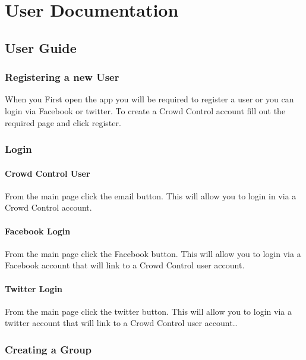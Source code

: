 

\chapter{User Documentation}



\section{User Guide}
 
 \subsection{Registering a new User}
When you First open the app you will be required to register a user or you can login via Facebook or twitter. To create a Crowd Control account fill out the required page and click register.
 
 \subsection{Login}
 
 \subsubsection{Crowd Control User}
 From the main page click the email button. This will allow you to login in via a Crowd Control account.
 
 
 \subsubsection{Facebook Login}
 From the main page click the Facebook button. This will allow you to login via a Facebook account that will link to a Crowd Control user account.
 
 \subsubsection{Twitter Login}
 From the main page click the twitter button. This will allow you to login via a twitter account that will link to a Crowd Control user account..
 
 \subsection{Creating a Group}
 
